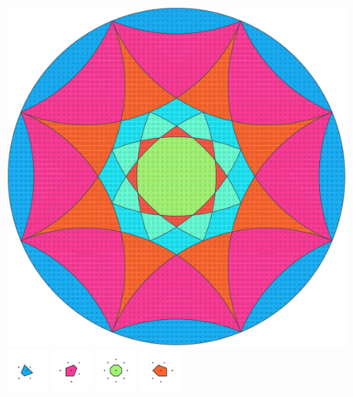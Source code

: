 \documentclass[text.tex]{subfiles}
\begin{document}
\clearpage
\pagestyle{fancy}
\fancyhf{}
\begin{figure}[h!]
\centering
\includegraphics[width=1\textwidth]{img/results/circle8/circle8_130656_(221_-91alpha_1).pdf}
\includegraphics[width=0.12\textwidth]{img/results/circle8/circle8_130656_(221_-91alpha_1)_001.pdf}
\includegraphics[width=0.12\textwidth]{img/results/circle8/circle8_130656_(221_-91alpha_1)_002.pdf}
\includegraphics[width=0.12\textwidth]{img/results/circle8/circle8_130656_(221_-91alpha_1)_003.pdf}
\includegraphics[width=0.12\textwidth]{img/results/circle8/circle8_130656_(221_-91alpha_1)_004.pdf}

\end{figure}
\end{document}
